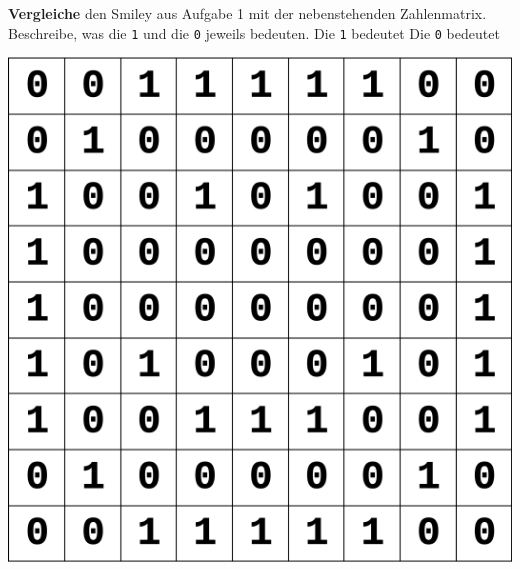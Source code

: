 \documentclass[a4paper, 12pt]{article}
\begin{document}
\begin{LKtext}
\aufgabe{}
	\begin{minipage}{0.65\textwidth}\vspace{0pt}
		\textbf{Vergleiche} den Smiley aus Aufgabe 1 mit der nebenstehenden Zahlenmatrix. Beschreibe, was die \texttt{1} und die \texttt{0} jeweils bedeuten.\newline
		Die \texttt{1} bedeutet 
		Die \texttt{0} bedeutet 
	\end{minipage}
	\hfill
	\begin{minipage}{0.25\textwidth}\vspace{0pt}
		\includegraphics[width=\linewidth]{A_3.png}
	\end{minipage}
	

\end{LKtext}
\end{document}
